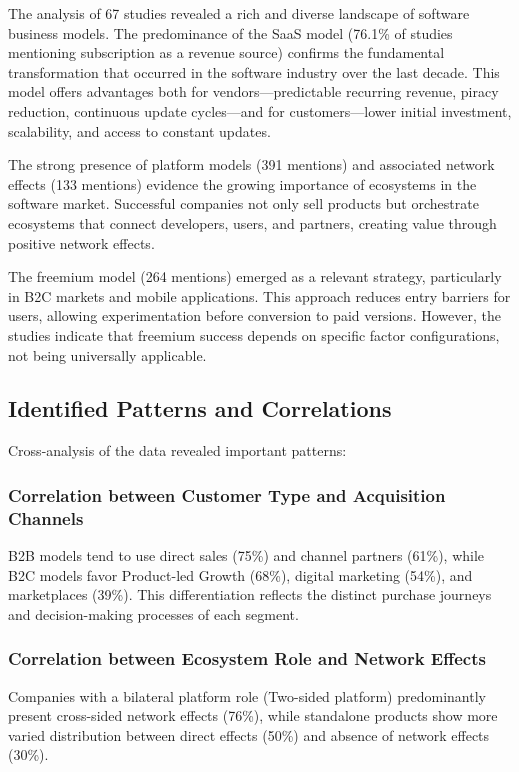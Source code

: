 \documentclass[journal]{IEEEtran}
\begin{document}
The analysis of 67 studies revealed a rich and diverse landscape of software business models. The predominance of the SaaS model (76.1\% of studies mentioning subscription as a revenue source) confirms the fundamental transformation that occurred in the software industry over the last decade. This model offers advantages both for vendors---predictable recurring revenue, piracy reduction, continuous update cycles---and for customers---lower initial investment, scalability, and access to constant updates.

The strong presence of platform models (391 mentions) and associated network effects (133 mentions) evidence the growing importance of ecosystems in the software market. Successful companies not only sell products but orchestrate ecosystems that connect developers, users, and partners, creating value through positive network effects.

The freemium model (264 mentions) emerged as a relevant strategy, particularly in B2C markets and mobile applications. This approach reduces entry barriers for users, allowing experimentation before conversion to paid versions. However, the studies indicate that freemium success depends on specific factor configurations, not being universally applicable.

\subsection{Identified Patterns and Correlations}

Cross-analysis of the data revealed important patterns:

\subsubsection{Correlation between Customer Type and Acquisition Channels}

B2B models tend to use direct sales (75\%) and channel partners (61\%), while B2C models favor Product-led Growth (68\%), digital marketing (54\%), and marketplaces (39\%). This differentiation reflects the distinct purchase journeys and decision-making processes of each segment.

\subsubsection{Correlation between Ecosystem Role and Network Effects}

Companies with a bilateral platform role (Two-sided platform) predominantly present cross-sided network effects (76\%), while standalone products show more varied distribution between direct effects (50\%) and absence of network effects (30\%).
\end{document}
